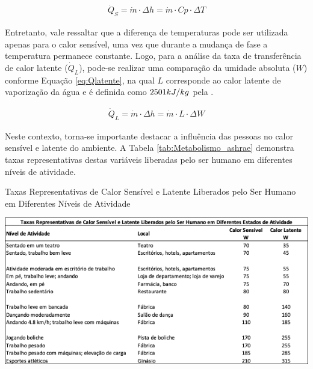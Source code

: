 \documentclass[acronym,symbols,table]{fei}
\begin{document}
\begin{equation} \label{eq:Qsensível}
\begin{aligned}
    \dot{Q}_{S}=\dot{m} \cdot \Delta{h}= \dot{m} \cdot Cp \cdot \Delta{T}
\end{aligned}
\end{equation}

Entretanto, vale ressaltar que a diferença de temperaturas pode ser utilizada apenas para o calor sensível, uma vez que durante a mudança de fase a temperatura permanece constante. Logo, para a análise da taxa de transferência de calor latente ($\dot{Q}_{L}$), pode-se realizar uma comparação da umidade absoluta ($W$) conforme Equação \ref{eq:Qlatente}, na qual $L$ corresponde ao calor latente de vaporização da água e é definida como $2501 \space kJ/kg$ pela \textcite{abnt16655}.

\begin{equation} \label{eq:Qlatente}
\begin{aligned}
    \dot{Q}_{L}=\dot{m} \cdot \Delta{h}= \dot{m} \cdot L \cdot \Delta{W}
\end{aligned}
\end{equation}

Neste contexto, torna-se importante destacar a influência das pessoas no calor sensível e latente do ambiente. A Tabela \ref{tab:Metabolismo_ashrae} demonstra taxas representativas destas variáveis liberadas pelo ser humano em diferentes níveis de atividade.

\begin{table}[!htb] 
 \centering
    \caption{Taxas Representativas de Calor Sensível e Latente Liberados pelo Ser Humano em Diferentes Níveis de Atividade}
    \includegraphics[width=1.0\linewidth]{Tabelas/Metabolismo_ashrae.png}
    \label{tab:Metabolismo_ashrae}
\end{table}
\end{document}
